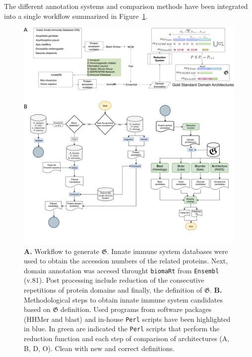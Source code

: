 \documentclass[11pt]{article}
\newcommand{\TODO}[1]{\begingroup\color{red}#1\endgroup}
\begin{document}
The different annotation systems and comparison methods have been integrated 
into a single workflow summarized in Figure~\ref{fig:workflow_golden}.

\begin{figure}[htb]
\begin{center}
\includegraphics[scale=0.17]{figures/completeALLWorkflow3}
\caption{\textbf{A.} Workflow to generate $\boldsymbol{\mathfrak{G}}$. Innate 
immune system databases were used to obtain the accession numbers of the 
related proteins. Next, domain annotation was accesed throught \texttt{biomaRt} 
from \texttt{Ensembl} (v.81). Post processing include reduction of the 
consecutive repetitions of protein domains and finally, the definition of 
$\boldsymbol{\mathfrak{G}}$. \textbf{B.} Methodological steps to obtain innate 
immune system candidates based on $\boldsymbol{\mathfrak{G}}$ definition. 
Used programs from software packages (HHMer and blast) and in-house 
\texttt{Perl} scripts have been highlighted in blue. In green are indicated the 
\texttt{Perl} scripts that perform the reduction function and each step of 
comparison of architectures (A, B, D, O). \TODO{Clean with new and correct definitions.}
}\label{fig:workflow_golden}
\end{center}
\end{figure}
\end{document}
